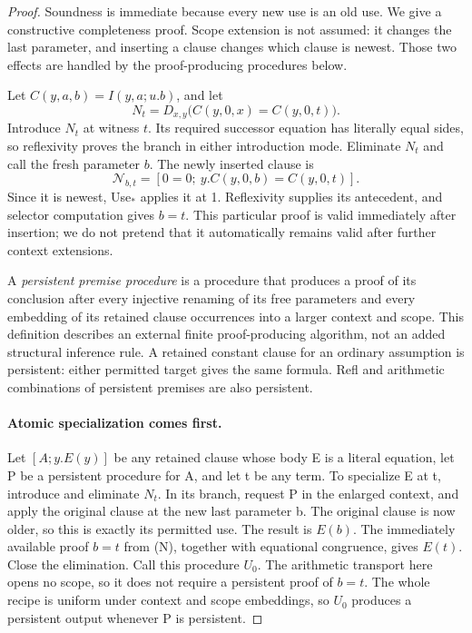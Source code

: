 \begin{proof}
Soundness is immediate because every new use is an old use.  We give a
constructive completeness proof.  Scope extension is not assumed: it
changes the last parameter, and inserting a clause changes which clause
is newest.  Those two effects are handled by the proof-producing
procedures below.

Let \(C(y,a,b)=I(y,a;u.b)\), and let
\[
 N_t=D_{x,y}\bigl(C(y,0,x)=C(y,0,t)\bigr).
 \tag{Name}
\]
Introduce \(N_t\) at witness \(t\).  Its required successor equation
has literally equal sides, so reflexivity proves the branch in either
introduction mode.  Eliminate \(N_t\) and call the fresh parameter
\(b\).  The newly inserted clause is
\[
 \mathcal N_{b,t}=[0=0;\ y.C(y,0,b)=C(y,0,t)].
 \tag{N}
\]
Since it is newest, Use$_*$ applies it at 1.  Reflexivity supplies its
antecedent, and selector computation gives \(b=t\).  This particular
proof is valid immediately after insertion; we do not pretend that it
automatically remains valid after further context extensions.

A \emph{persistent premise procedure} is a procedure that produces a
proof of its conclusion after every injective renaming of its free
parameters and every embedding of its retained clause occurrences into
a larger context and scope.  This definition describes an external
finite proof-producing algorithm, not an added structural inference
rule.  A retained constant clause for an ordinary assumption is
persistent: either permitted target gives the same formula.  Refl and
arithmetic combinations of persistent premises are also persistent.

\paragraph{Atomic specialization comes first.}
Let \([A;y.E(y)]\) be any retained clause whose body E is a literal
equation, let P be a persistent procedure for A, and let t be any term.
To specialize E at t, introduce and eliminate \(N_t\).  In its branch,
request P in the enlarged context, and apply the original clause at the
new last parameter b.  The original clause is now older, so this is
exactly its permitted use.  The result is \(E(b)\).  The immediately
available proof \(b=t\) from (N), together with equational congruence,
gives \(E(t)\).  Close the elimination.  Call this procedure \(U_0\).
The arithmetic transport here opens no scope, so it does not require a
persistent proof of \(b=t\).  The whole recipe is uniform under context
and scope embeddings, so \(U_0\) produces a persistent output whenever
P is persistent.


\end{proof}
